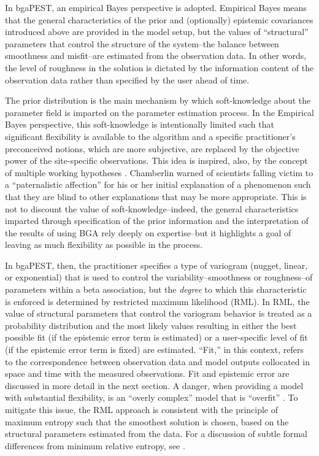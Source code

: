 \documentclass[11pt,oneside,onecolumn]{usgsreport}
\begin{document}
\begin{multicols}{2}
\begin{bibunit}
In bgaPEST, an empirical Bayes \citep{Robbins1956,casella1985} perspective
is adopted. Empirical Bayes means that the general characteristics
of the prior and (optionally) epistemic covariances introduced above
are provided in the model setup, but the values of ``structural''
parameters that control the structure of the system--the balance between
smoothness and misfit--are estimated from the observation data. In
other words, the level of roughness in the solution is dictated by
the information content of the observation data rather than specified
by the user ahead of time. 

The prior distribution is the main mechanism by which soft-knowledge
about the parameter field is imparted on the parameter estimation
process. In the Empirical Bayes perspective, this soft-knowledge is
intentionally limited such that significant flexibility is available
to the algorithm and a specific practitioner's preconceived notions,
which are more subjective, are replaced by the objective power of
the site-specific observations. This idea is inspired, also, by the
concept of multiple working hypotheses \citep{Chamberlin1890}. Chamberlin
warned of scientists falling victim to a ``paternalistic affection''
for his or her initial explanation of a phenomenon such that they
are blind to other explanations that may be more appropriate. This
is not to discount the value of soft-knowledge--indeed, the general
characteristics imparted through specification of the prior information
and the interpretation of the results of using BGA rely deeply on
expertise--but it highlights a goal of leaving as much flexibility
as possible in the process. 

In bgaPEST, then, the practitioner specifies a type of variogram (nugget,
linear, or exponential) that is used to control the variability--smoothness
or roughness--of parameters within a beta association, but the \emph{degree}
to which this characteristic is enforced is determined by restricted
maximum likelihood (RML). In RML, the value of structural parameters
that control the variogram behavior is treated as a probability distribution
and the most likely values resulting in either the best possible fit
(if the epistemic error term is estimated) or a user-specific level
of fit (if the epistemic error term is fixed) are estimated. ``Fit,''
in this context, refers to the correspondence between observation
data and model outputs collocated in space and time with the measured
observations. Fit and epistemic error are discussed in more detail
in the next section. A danger, when providing a model with substantial
flexibility, is an ``overly complex'' model that is ``overfit''
\citep[e.g. ][]{drapersmith66,Hill2006}. To mitigate this issue,
the RML approach is consistent with the principle of maximum entropy
such that the smoothest solution is chosen, based on the structural
parameters estimated from the data. For a discussion of subtle formal
differences from minimum relative entropy, see \citet[p. 333-342]{Rubin2003}.


\end{bibunit}
\end{multicols}
\end{document}
